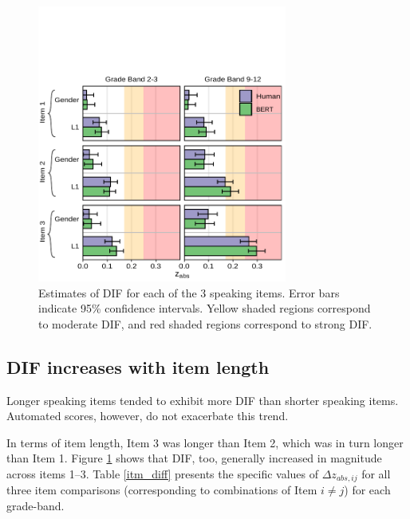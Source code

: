 \documentclass [PhD] {uclathes}
\begin{document}
\begin{figure}[h]
    \centering
    \hspace{-.6cm}
    \includegraphics[width=8.2cm]{figures/20230422_ETS-DIF_zabs_itm_edit.pdf}
    \caption{Estimates of DIF for each of the 3 speaking items. Error bars indicate 95\% confidence intervals. Yellow shaded regions correspond to moderate DIF, and red shaded regions correspond to strong DIF.}
    \label{fig:zabs_itm}
\end{figure}


\subsection{DIF increases with item length}

Longer speaking items tended to exhibit more DIF than shorter speaking items. Automated scores, however, do not exacerbate this trend. 

In terms of item length, Item 3 was longer than Item 2, which was in turn longer than Item 1. Figure \ref{fig:zabs_itm} shows that DIF, too, generally increased in magnitude across items 1–3. Table \ref{itm_diff} presents the specific values of $\Delta z_{abs,ij}$ for all three item comparisons (corresponding to combinations of Item $i \neq j$) for each grade-band. 
\end{document}
